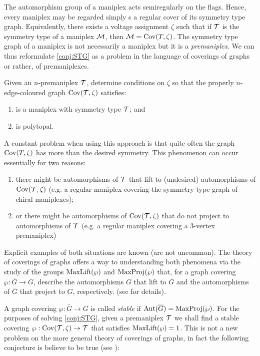 \documentclass[a4paper,12pt,english]{article}
\begin{document}
The automorphism group of a maniplex acts semiregularly on the flags.
Hence, every maniplex may be regarded simply s a regular cover of its symmetry type graph. 
Equivalently, there exists a voltage assignment $\zeta$ such that if $\mathcal{T}$ is the symmetry type of a maniplex $\mathcal{M}$, then $\mathcal{M} = \operatorname{Cov}(T,\zeta)$.
The symmetry type graph of a maniplex is not necessarily a maniplex but it is a \emph{premaniplex}.
We can thus reformulate \cref{conj:STG} as a problem in the language of coverings of graphs or rather, of premaniplexes.

\begin{problem}\label{prob:STGgraphs}
  Given an $n$-premaniplex $\mathcal{T}$, determine conditions on $\zeta$ so that the properly $n$-edge-coloured graph $\operatorname{Cov}(\mathcal{T},\zeta)$ satisfies:
  \begin{enumerate}[label=\textit{\alph*)}]
      \item is a maniplex with symmetry type $\mathcal{T}$; and
      \item is polytopal.
  \end{enumerate}
  \end{problem}

A constant problem when using this approach is that quite often the graph $\operatorname{Cov}(T, \zeta)$ has more than the desired symmetry. 
This phenomenon can occur essentially for two reasons:
\begin{enumerate}[label=\textit{\roman*)}]
  \item there might be automorphisms of $\mathcal{T}$ that lift to (undesired) automorphisms of $\operatorname{Cov}(\mathcal{T},\zeta)$ (e.g. a regular maniplex covering the symmetry type graph of chiral maniplexes);
  \item or there might be automorphisms of $\operatorname{Cov}(\mathcal{T},\zeta)$ that do not project to automorphisms of $\mathcal{T}$ (e.g. a regular maniplex covering a $3$-vertex premaniplex) 
\end{enumerate}

Explicit examples of both situations are known  (are not uncommon). 
The theory of coverings of graphs offers a way to understanding both phenomena via the study of the groups $\operatorname{MaxLift}(\wp)$ and $\operatorname{MaxProj}(\wp)$ that, for a graph covering $\wp: \bar{G} \to G$, describe the automorphisms $G$ that lift to $\bar{G}$ and the automorphisms of $\bar{G}$ that project to $G$, respectively. (see \cite{MalniPozar2016_SplitStructureLifted,MalniPozar2019_SplitLiftingsSectional,MalnMarPot2004_ElementaryAbelianCovers,MalnNedSko2000_LiftingGraphAutomorphisms} for details).

A graph covering $\wp: \bar{G} \to G$ is called \emph{stable} if $\operatorname{Aut}(\overline{G}) = \operatorname{MaxProj}(\wp)$. 
For the purposes of solving \cref{conj:STG}, given a premaniplex $\mathcal{T}$ we shall find a stable covering $\wp: \operatorname{Cov}(\mathcal{T}, \zeta) \to \mathcal{T}$ that satisfies $\operatorname{MaxLift}(\wp) = 1$. 
This is not a new problem on the more general theory of coverings of graphs, in fact the following conjecture is believe to be true (see \cite{PotocSpiga2019_LiftingPrescribedGroup}):
\end{document}
